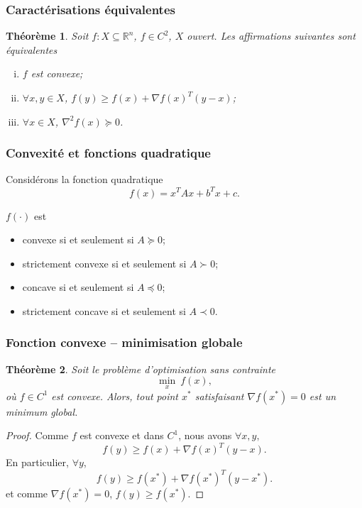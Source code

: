 \documentclass[usepdftitle=false]{beamer}
\newtheorem{thm}{Théorème}
\def\RR{\mathbb{R}}
\begin{document}
\begin{frame}
\frametitle{Caractérisations équivalentes}

\begin{thm}
Soit $f: X \subseteq \RR^n$, $f \in C^2$, $X$ ouvert. Les affirmations suivantes sont équivalentes
\begin{enumerate}[(i)]
	\item $f$ est convexe;
	\item $\forall x, y \in X$, $f(y) \geq f(x) + \nabla f(x)^T(y-x)$;
	\item $\forall x \in X$, $\nabla^2 f(x) \succeq 0$.
\end{enumerate}
\end{thm}

\end{frame}

\begin{frame}
\frametitle{Convexité et fonctions quadratique}

Considérons la fonction quadratique
$$
f(x) = x^TAx + b^Tx + c.
$$

\mbox{}

$f(\cdot)$ est
\begin{itemize}
\item
convexe si et seulement si $A \succeq 0$;
\item
strictement convexe si et seulement si $A \succ 0$;
\item
concave si et seulement si $A \preceq 0$;
\item
strictement concave si et seulement si $A \prec 0$.
\end{itemize}

\end{frame}

\begin{frame}
\frametitle{Fonction convexe -- minimisation globale}

\begin{thm}
Soit le problème d'optimisation sans contrainte
$$\min_x\ f(x),$$
où $f \in C^1$ est convexe.
Alors, tout point $x^*$ satisfaisant $\nabla f(x^*) = 0$ est un minimum global.
\end{thm}

\begin{proof}
Comme $f$ est convexe et dans $C^1$, nous avons $\forall x, y,$
$$
f(y) \geq f(x) + \nabla f(x)^T(y-x).
$$
En particulier, $\forall y$,
$$
f(y) \geq f(x^*) + \nabla f(x^*)^T(y-x^*).
$$
et comme $\nabla f(x^*) = 0$, $f(y) \geq f(x^*)$.
\end{proof}

\end{frame}
\end{document}
